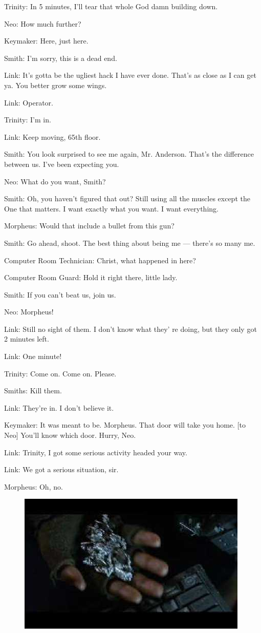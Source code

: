 \documentclass{ctexart}
\newenvironment{myquote}{\color{green} \setlength{\leftskip}{6em} \setlength{\rightskip}{4em} \setlength{\parindent}{-2em}}{\par}
\begin{document}
\begin{myquote}
Trinity: In 5 minutes, I'll tear that whole God damn building down.

Neo: How much further?

Keymaker: Here, just here.

Smith: I'm sorry, this is a dead end.

Link: It's gotta be the ugliest hack I have ever done. That's as close as I can get ya. You better grow some wings.

Link: Operator.

Trinity: I'm in.

Link: Keep moving, 65th floor.

Smith: You look surprised to see me again, Mr. Anderson. That's the difference between us. I've been expecting you.

Neo: What do you want, Smith?

Smith: Oh, you haven't figured that out? Still using all the muscles except the One that matters. I want exactly what you want. I want everything.

Morpheus: Would that include a bullet from this gun?

Smith: Go ahead, shoot. The best thing about being me --- there's so many me.

Computer Room Technician: Christ, what happened in here?

Computer Room Guard: Hold it right there, little lady.

Smith: If you can't beat us, join us.

Neo: Morpheus!

Link: Still no sight of them. I don't know what they' re doing, but they only got 2 minutes left.

Link: One minute!

Trinity: Come on. Come on. Please.

Smiths: Kill them.

Link: They're in. I don't believe it.

Keymaker: It was meant to be. Morpheus. That door will take you home. [to Neo] You'll know which door. Hurry, Neo.

Link: Trinity, I got some serious activity headed your way.

Link: We got a serious situation, sir.

Morpheus: Oh, no.
\end{myquote}

\begin{figure}[htb]
\centering
\includegraphics[width=0.5\linewidth]{fig/read_reloaded-147}
\end{figure}
\end{document}
